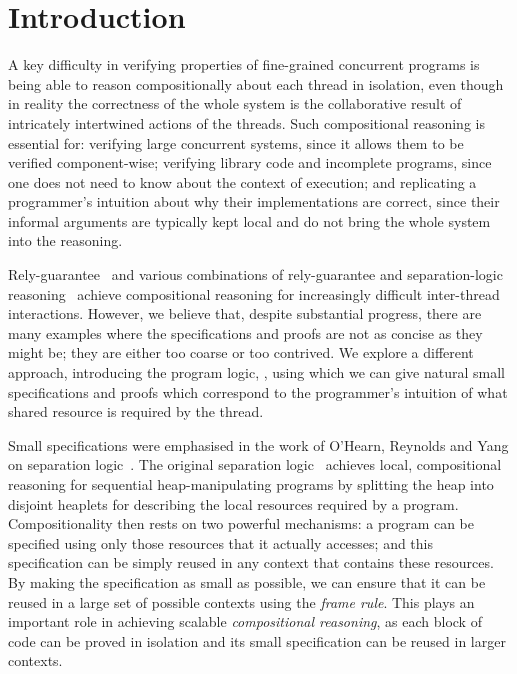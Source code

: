 \section{Introduction}
\label{sec:introduction}



A key difficulty in verifying properties of fine-grained concurrent
programs is being able to reason compositionally about each thread in
isolation, even though in reality the correctness of the whole system
is the collaborative result of intricately intertwined actions of the
threads.  Such compositional reasoning is essential for: verifying
large concurrent systems, since it allows them to be verified
component-wise;  verifying library code and incomplete programs,
since one does not need to know about the context of execution; and 
replicating a programmer's intuition about why their implementations
are correct, since their informal arguments are typically  kept local and do
not bring the whole system into the reasoning.


Rely-guarantee~\cite{rg} and various combinations of
rely-guarantee and separation-logic
reasoning~\cite{viktor-marriage,dg,lrg,cap-ecoop10,icap,tada} achieve
compositional reasoning for increasingly difficult inter-thread
interactions. However, we believe that, despite substantial progress, there are many
examples where the specifications and proofs are not as concise as
they might be; they  are either too coarse or
too 
contrived. 
We explore a different approach, introducing the
program logic, \colosl, using which we can give natural small
specifications and proofs which correspond to the  programmer's intuition of what shared
resource
is required by the thread. 




Small specifications were emphasised in the work of O'Hearn, Reynolds
and Yang on separation logic~\cite{o2001local}.  The original
separation logic~\cite{rey02,seplog} achieves local, compositional reasoning
for sequential heap-manipulating programs by splitting the heap into
disjoint heaplets for describing the local resources required by a
program. Compositionality then rests on two powerful mechanisms: a program
can be specified using only those resources that it actually accesses;
and this specification can be simply reused in any context that
contains these resources.  By making the specification as small as
possible, we can ensure that it can be reused in a large set of
possible contexts using the {\em frame rule}. This plays an important
role in achieving scalable \emph{compositional reasoning}, as each
block of code can be proved in isolation and its small specification
can be reused in larger contexts.


